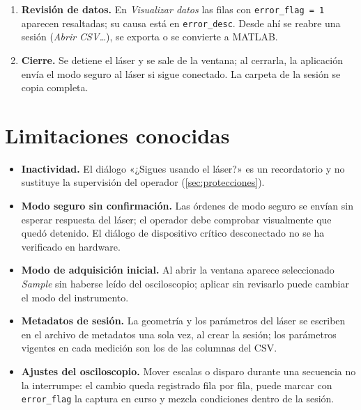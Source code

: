 \begin{enumerate}[leftmargin=*, itemsep=0pt, topsep=2pt]
    la secuencia el panel del osciloscopio queda bloqueado y la
    aplicación impone el modo \emph{Average} (100 promedios por tiempo;
    \num{10000} por temperatura), que restaura al terminar. Al
    concluir, por término normal, detención o aborto, el láser recibe
    las órdenes de modo seguro.
  \item \textbf{Revisión de datos.} En \emph{Visualizar datos} las
    filas con \texttt{error\_flag = 1} aparecen resaltadas; su causa
    está en \texttt{error\_desc}. Desde ahí se reabre una sesión
    (\emph{Abrir CSV\ldots}), se exporta o se convierte a MATLAB.
  \item \textbf{Cierre.} Se detiene el láser y se sale de la ventana; al
    cerrarla, la aplicación envía el modo seguro al láser si sigue
    conectado. La carpeta de la sesión se copia completa.
\end{enumerate}

\section*{Limitaciones conocidas}

\begin{itemize}[leftmargin=*, itemsep=0pt, topsep=2pt]
  \item \textbf{Inactividad.} El diálogo «¿Sigues usando el láser?» es un
    recordatorio y no sustituye la supervisión del operador
    (\cref{sec:protecciones}).
  \item \textbf{Modo seguro sin confirmación.} Las órdenes de modo
    seguro se envían sin esperar respuesta del láser; el operador debe
    comprobar visualmente que quedó detenido. El diálogo de dispositivo crítico
    desconectado no se ha verificado en hardware.
  \item \textbf{Modo de adquisición inicial.} Al abrir la ventana
    aparece seleccionado \emph{Sample} sin haberse leído del
    osciloscopio; aplicar sin revisarlo puede cambiar el modo del
    instrumento.
  \item \textbf{Metadatos de sesión.} La geometría y los parámetros del
    láser se escriben en el archivo de metadatos una sola vez, al crear
    la sesión; los parámetros vigentes en cada medición son los de las
    columnas del CSV.
  \item \textbf{Ajustes del osciloscopio.} Mover escalas o disparo
    durante una secuencia no la interrumpe: el cambio queda registrado
    fila por fila, puede marcar con \texttt{error\_flag} la captura en
    curso y mezcla condiciones dentro de la sesión.
\end{itemize}

